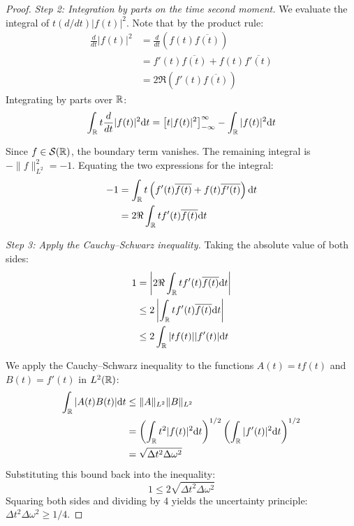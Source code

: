 \begin{proof}
\textit{Step 2: Integration by parts on the time second moment.}
We evaluate the integral of $t (d/dt) |f(t)|^2$. Note that by the product rule:
\begin{equation}
\begin{aligned}
\frac{d}{dt} |f(t)|^2 &= \frac{d}{dt} (f(t) \overline{f(t)}) \\
&= f'(t) \overline{f(t)} + f(t) \overline{f'(t)} \\
&= 2 \Re\left( f'(t) \overline{f(t)} \right)
\end{aligned}
\end{equation}
Integrating by parts over $\mathbb{R}$:
\begin{equation}
\int_{\mathbb{R}} t \frac{d}{dt} |f(t)|^2 \mathrm{d} t = \left[ t |f(t)|^2 \right]_{-\infty}^\infty - \int_{\mathbb{R}} |f(t)|^2 \mathrm{d} t
\end{equation}

Since $f \in \mathcal{S}(\mathbb{R})$, the boundary term vanishes. The remaining integral is $-\|f\|_{L^2}^2 = -1$. Equating the two expressions for the integral:
\begin{equation}
\begin{aligned}
-1 &= \int_{\mathbb{R}} t \left( f'(t) \overline{f(t)} + f(t) \overline{f'(t)} \right) \mathrm{d} t \\
&= 2 \Re \int_{\mathbb{R}} t f'(t) \overline{f(t)} \mathrm{d} t
\end{aligned}
\end{equation}

\textit{Step 3: Apply the Cauchy--Schwarz inequality.}
Taking the absolute value of both sides:
\begin{equation}
\begin{aligned}
1 &= \left| 2 \Re \int_{\mathbb{R}} t f'(t) \overline{f(t)} \mathrm{d} t \right| \\
&\leq 2 \left| \int_{\mathbb{R}} t f'(t) \overline{f(t)} \mathrm{d} t \right| \\
&\leq 2 \int_{\mathbb{R}} |t f(t)| |f'(t)| \mathrm{d} t
\end{aligned}
\end{equation}

We apply the Cauchy--Schwarz inequality to the functions $A(t) = t f(t)$ and $B(t) = f'(t)$ in $L^2(\mathbb{R})$:
\begin{equation}
\begin{aligned}
\int_{\mathbb{R}} |A(t) B(t)| \mathrm{d} t &\leq \|A\|_{L^2} \|B\|_{L^2} \\
&= \left( \int_{\mathbb{R}} t^2 |f(t)|^2 \mathrm{d} t \right)^{1/2} \left( \int_{\mathbb{R}} |f'(t)|^2 \mathrm{d} t \right)^{1/2} \\
&= \sqrt{\Delta t^2 \Delta \omega^2}
\end{aligned}
\end{equation}
Substituting this bound back into the inequality:
\begin{equation}
1 \leq 2 \sqrt{\Delta t^2 \Delta \omega^2}
\end{equation}
Squaring both sides and dividing by 4 yields the uncertainty principle: $\Delta t^2 \Delta \omega^2 \geq 1/4$.


\end{proof}
